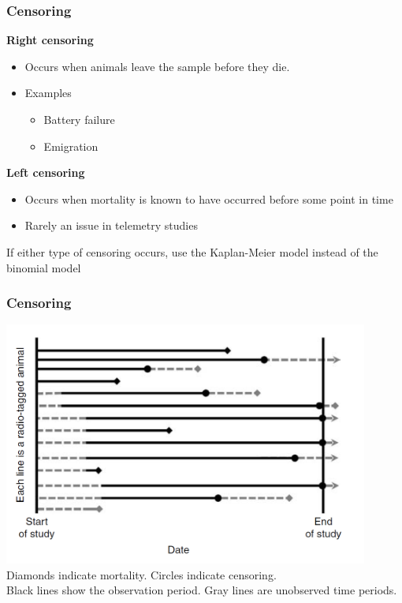 \documentclass[color=usenames,dvipsnames]{beamer}\usepackage[]{graphicx}\usepackage[]{color}
\begin{document}
\begin{frame}
  \frametitle{Censoring}
  {\bf Right censoring} 
  \begin{itemize}
    \item Occurs when animals leave the sample before they die.
    \item Examples
    \begin{itemize}
      \item Battery failure
      \item Emigration
    \end{itemize}
  \end{itemize}
  \pause
  {\bf Left censoring}
  \begin{itemize}
    \item Occurs when mortality is known to have occurred before some
      point in time
    \item Rarely an issue in telemetry studies
  \end{itemize}
  \pause
  \vfill
  {\centering If either type of censoring occurs, use the
    Kaplan-Meier model instead of the binomial model \par}
\end{frame}



\begin{frame}
  \frametitle{Censoring}
  \centering
  \includegraphics[width=0.9\textwidth]{figs/censoring} \\
  Diamonds indicate mortality. Circles indicate censoring. \\
  Black lines show the observation period. Gray lines are unobserved
  time periods. 
\end{frame}
\end{document}
